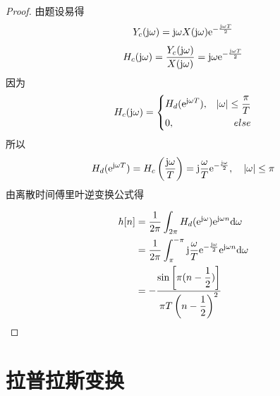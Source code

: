 \begin{proof}

    由题设易得
    $$Y_c(\mathrm{j} \omega) = \mathrm{j} \omega X(\mathrm{j} \omega) \mathrm{e}^{-\frac{\mathrm{j} \omega T}{2}}$$
    $$H_c(\mathrm{j} \omega) = \dfrac{Y_c(\mathrm{j} \omega)}{X(\mathrm{j} \omega)} = \mathrm{j} \omega \mathrm{e}^{-\frac{\mathrm{j} \omega T}{2}}$$
    因为
    $$H_c(\mathrm{j} \omega) = \left\{
        \begin{aligned}
            & H_d(\mathrm{e}^{\mathrm{j} \omega T}), & |\omega| \leq \dfrac{\pi}{T} \\
            & 0, & else 
        \end{aligned}
        \right.
    $$
    所以
    $$H_d(\mathrm{e}^{\mathrm{j} \omega T}) = H_c\left(\dfrac{\mathrm{j} \omega}{T}\right) = \mathrm{j} \dfrac{\omega}{T} \mathrm{e}^{-\frac{\mathrm{j} \omega}{2}}, \quad |\omega| \leq \pi$$
    由离散时间傅里叶逆变换公式得
    
    \begin{align*}
        h[n] & = \dfrac{1}{2\pi} \int_{2\pi}{H_d(\mathrm{e}^{\mathrm{j} \omega})\mathrm{e}^{\mathrm{j} \omega n}}\mathrm{d} \omega \\
        & = \dfrac{1}{2\pi} \int_{\pi}^{-\pi}{\mathrm{j} \dfrac{\omega}{T} \mathrm{e}^{-\frac{\mathrm{j} \omega}{2}} \mathrm{e}^{\mathrm{j} \omega n}}\mathrm{d} \omega \\
        & = - \dfrac{\sin\left[\pi (n - \dfrac{1}{2})\right]}{\pi T \left(n - \dfrac{1}{2}\right)^2}
    \end{align*}

\end{proof}

\section{拉普拉斯变换}

